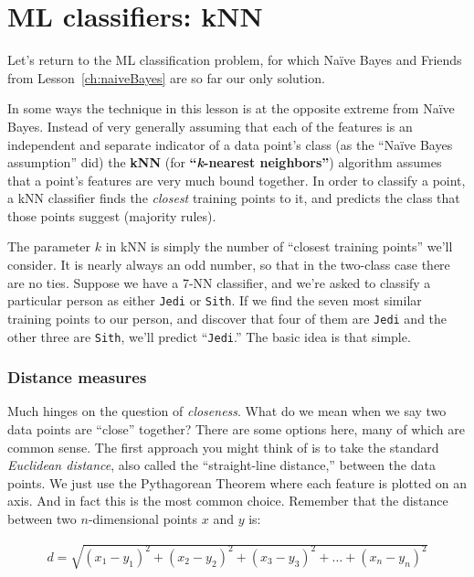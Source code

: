 
\chapter{ML classifiers: kNN}

Let's return to the ML classification problem, for which Na\"{i}ve Bayes and
Friends from Lesson~\ref{ch:naiveBayes} are so far our only solution.

In some ways the technique in this lesson is at the opposite extreme from
Na\"{i}ve Bayes. Instead of very generally assuming that each of the features
is an independent and separate indicator of a data point's class (as the
``Na\"{i}ve Bayes assumption'' did) the \textbf{kNN} (for
\textbf{``\textit{k}-nearest neighbors''}) algorithm assumes that a point's
features are very much bound together. In order to classify a point, a kNN
classifier finds the \textit{closest} training points to it, and predicts the
class that those points suggest (majority rules).

The parameter $k$ in kNN is simply the number of ``closest training points''
we'll consider. It is nearly always an odd number, so that in the two-class
case there are no ties. Suppose we have a 7-NN classifier, and we're asked to
classify a particular person as either \texttt{Jedi} or \texttt{Sith}. If we
find the seven most similar training points to our person, and discover that
four of them are \texttt{Jedi} and the other three are \texttt{Sith}, we'll
predict ``\texttt{Jedi}.'' The basic idea is that simple.

\subsection{Distance measures}

Much hinges on the question of \textit{closeness}. What do we mean when we say
two data points are ``close'' together? There are some options here, many of
which are common sense. The first approach you might think of is to take the
standard \textit{Euclidean distance}, also called the ``straight-line
distance,'' between the data points. We just use the Pythagorean Theorem where
each feature is plotted on an axis. And in fact this is the most common
choice. Remember that the distance between two $n$-dimensional points $x$ and
$y$ is:

\begin{align*}
d = \sqrt{(x_1-y_1)^2 + (x_2-y_2)^2 + (x_3-y_3)^2 + \dots + (x_n-y_n)^2}
\end{align*}

